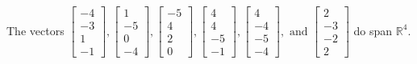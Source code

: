 \begin{exercise}
\begin{exerciseStatement}
  \end{exerciseStatement}
  \begin{exerciseAnswer}
   The vectors \(\left[\begin{array}{r}
-4 \\
-3 \\
1 \\
-1
\end{array}\right] , \left[\begin{array}{r}
1 \\
-5 \\
0 \\
-4
\end{array}\right] , \left[\begin{array}{r}
-5 \\
4 \\
2 \\
0
\end{array}\right] , \left[\begin{array}{r}
4 \\
4 \\
-5 \\
-1
\end{array}\right] , \left[\begin{array}{r}
4 \\
-4 \\
-5 \\
-4
\end{array}\right] , \text{ and } \left[\begin{array}{r}
2 \\
-3 \\
-2 \\
2
\end{array}\right]\) 
  	 do  
	span \(\mathbb{R}^4\).
  


  \end{exerciseAnswer}
\end{exercise}
